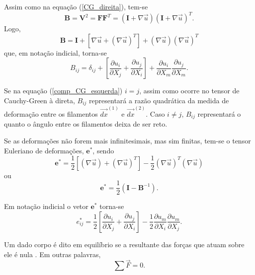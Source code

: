 Assim como na equação (\ref{CG_direita}), tem-se 
\begin{equation}
	\textbf{B} = \textbf{V} ^{2} = \textbf{F} \textbf{F} ^{T} = ( \textbf{I} + { \nabla} \vec{u}) ( \textbf{I} + { \nabla} \vec{u}) ^{T}.
\end{equation}
Logo,
\begin{equation}
	\textbf{B} = \textbf{I} + [ { \nabla} \vec{u} + ( { \nabla} \vec{u}) ^{T}] + ( { \nabla} \vec{u}) ( { \nabla} \vec{u}) ^{T}
\end{equation}
que, em notação indicial, torna-se
\begin{equation} \label{comp_CG_esquerda}
	B_{ij} = \delta _{ij} + \left[ \dfrac{ \partial u_{i}}{ \partial X_{j}} + \dfrac{ \partial u_{j}}{ \partial X_{i}} \right] +  \dfrac{ \partial u_{i}}{ \partial X_{m}}  \dfrac{ \partial u_{j}}{ \partial X_{m}}.
\end{equation}

Se na equação (\ref{comp_CG_esquerda}) $ i=j $, assim como ocorre no tensor de Cauchy-Green à direta, $ B_{ij} $ representará a razão quadrática da medida de deformação entre os filamentos $ \vec{dx} ^{ (1)} $ e  $ \vec{dx} ^{ (2)} $. Caso $ i \neq j $, $ B_{ij} $ representará o quanto o ângulo entre os filamentos deixa de ser reto.

Se as deformações não forem mais infinitesimais, mas sim finitas, tem-se o tensor Euleriano de deformações,  $ \textbf{e} ^{*}$, sendo  
\begin{equation}
	\textbf{e} ^{*} = \dfrac{1}{2} [( { \nabla} \vec{u}) + ( { \nabla} \vec{u}) ^{T}] - \dfrac{1}{2} ( { \nabla} \vec{u}) ^{T} ( { \nabla} \vec{u})
\end{equation}
ou
\begin{equation}
	\textbf{e} ^{*} = \dfrac{1}{2} ( \textbf{I} - \textbf{B} ^{-1}).
\end{equation}

Em notação indicial o vetor $ \textbf{e} ^{*}$ torna-se
\begin{equation}
	e_{ij} ^{*} = \dfrac{1}{2} \left[ \dfrac{ \partial u_{i}}{ \partial X_{j}} + \dfrac{ \partial u_{j}}{ \partial X_{i}} \right] - \dfrac{1}{2} \dfrac{ \partial u_{m}}{ \partial X_{i}}  \dfrac{ \partial u_{m}}{ \partial X_{j}}.
\end{equation}

Um dado corpo é dito em equilíbrio se a resultante das forças que atuam sobre ele é nula \cite{Malvern}. Em outras palavras,
\begin{equation}
	\sum \vec{F} = 0.
\end{equation}  

